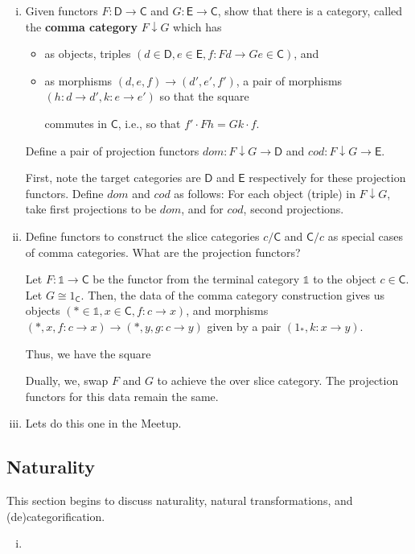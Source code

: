\documentclass[10pt, oneside]{article}   	%
\newcommand{\cat}[1]{\bm{ \mathsf{#1} }}
\newcommand{\cc}{\cat{C}}
\newcommand{\dd}{\cat{D}}
\newcommand{\ee}{\cat{E}}
\newcommand{\one}{\mathbb{1}}
\begin{document}
\begin{enumerate}[(i)]
\item Given functors $ F : \dd \to \cc$ and $G : \ee \to \cc$, show that there is a category, called the \textbf{comma category} $F \downarrow G$ which has 

\begin{itemize}
\item as objects, triples $(d \in \dd, e \in \ee, f : Fd \to Ge \in \cc)$, and 
\item as morphisms $(d, e, f) \to (d', e', f')$, a pair of morphisms $(h : d \to d', k: e \to e')$ so that the square 

\begin{center}
\end{center}

commutes in $\cc$, i.e., so that $f' \cdot Fh = Gk \cdot f$. 
\end{itemize}

Define a pair of projection functors $dom : F \downarrow G \to \dd$ and $cod : F \downarrow G \to \ee$. 


First, note the target categories are $\dd$ and $\ee$ respectively for these projection functors. Define $dom$ and $cod$ as follows: For each object (triple) in $F \downarrow G$, take first projections to be $dom$, and for $cod$, second projections. 

\item Define functors to construct the slice categories $c / \cc$ and $\cc / c$ as special cases of comma categories. What are the projection functors?

Let $F : \one \to \cc$ be the functor from the terminal category $\one$ to the object $c \in \cc$. Let $G \cong 1_{\cc}$. Then, the data of the comma category construction gives us objects $(* \in \one, x \in \cc, f : c \to x)$, and morphisms $(*, x, f: c \to x) \to (*, y, g: c \to y)$ given by a pair $(1_*, k: x \to y)$. 

Thus, we have the square

\begin{center}
\end{center}

Dually, we, swap $F$ and $G$ to achieve the over slice category. The projection functors for this data  remain the same. 

\item Lets do this one in the Meetup.
\end{enumerate}

\subsection{Naturality}

This section begins to discuss naturality, natural transformations, and (de)categorification. 

\begin{enumerate}[(i)]
\item 
\end{enumerate}
\end{document}
